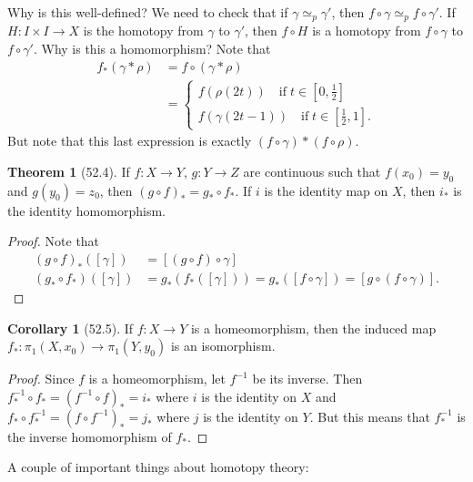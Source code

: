 \documentclass{article}
\newcommand{\nline}{\vspace*{0.5\baselineskip}}
\theoremstyle{definition}
\newtheorem{theorem}{Theorem}[subsection]
\newtheorem{corollary}{Corollary}[subsection]
\begin{document}
\begin{flushleft}
\nline

Why is this well-defined? We need to check that if $\gamma \simeq_p \gamma'$, then $f \circ \gamma \simeq_p f \circ \gamma'$. If $H : I \times I \to X$ is the homotopy from $\gamma$ to $\gamma'$, then $f \circ H$ is a homotopy from $f \circ \gamma$ to $f \circ \gamma'$. Why is this a homomorphism? Note that
\[
\begin{align}
    f_*(\gamma * \rho) &= f \circ (\gamma * \rho) \\
    &= \begin{cases}
    f(\rho(2t)) \quad \text{if} \; t \in [0,\frac{1}{2}] \\
    f(\gamma(2t - 1)) \quad \text{if} \; t \in [\frac{1}{2},1].
    \end{cases}
\end{align}
\]
But note that this last expression is exactly $(f \circ \gamma) * (f \circ \rho)$.

\begin{theorem}[52.4]
If $f : X \to Y$, $g : Y \to Z$ are continuous such that $f(x_0) = y_0$ and $g(y_0) = z_0$, then $(g \circ f)_* = g_* \circ f_*$. If $i$ is the identity map on $X$, then $i_*$ is the identity homomorphism.
\end{theorem}

\begin{proof}
Note that
\[
\begin{align}
    (g \circ f)_*([\gamma]) &= [(g \circ f) \circ \gamma] \\
    (g_* \circ f_*)([\gamma]) &= g_*(f_*([\gamma])) = g_*([f \circ \gamma]) = [g \circ (f \circ \gamma)].
\end{align}
\]
\end{proof}

\begin{corollary}[52.5]
If $f : X \to Y$ is a homeomorphism, then the induced map $f_*: \pi_1(X, x_0) \to \pi_1(Y, y_0)$ is an isomorphism.
\end{corollary}

\begin{proof}
Since $f$ is a homeomorphism, let $f^{-1}$ be its inverse. Then $f^{-1}_* \circ f_* = (f^{-1} \circ f)_* = i_*$ where $i$ is the identity on $X$ and $f_* \circ f^{-1}_* = (f \circ f^{-1})_* = j_*$ where $j$ is the identity on $Y$. But this means that $f^{-1}_*$ is the inverse homomorphism of $f_*$.
\end{proof}

A couple of important things about homotopy theory:


\end{flushleft}
\end{document}
